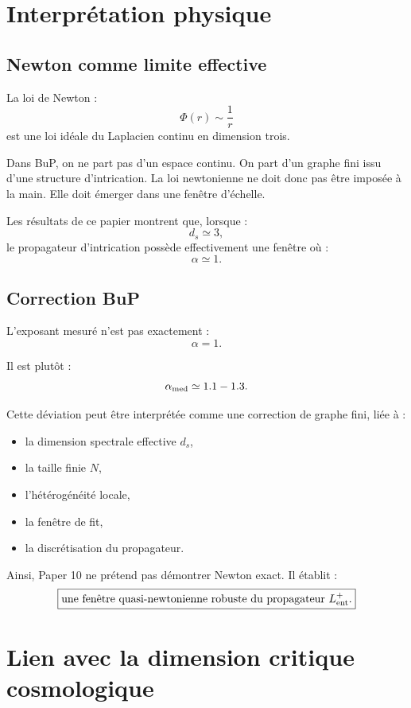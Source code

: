 \documentclass[11pt,a4paper]{article}
\begin{document}
\section{Interprétation physique}

\subsection{Newton comme limite effective}

La loi de Newton :
\[
\Phi(r)
\sim
\frac{1}{r}
\]
est une loi idéale du Laplacien continu en dimension trois.

Dans BuP, on ne part pas d'un espace continu. On part d'un graphe fini issu
d'une structure d'intrication. La loi newtonienne ne doit donc pas être imposée
à la main. Elle doit émerger dans une fenêtre d'échelle.

Les résultats de ce papier montrent que, lorsque :
\[
d_s\simeq3,
\]
le propagateur d'intrication possède effectivement une fenêtre où :
\[
\alpha\simeq1.
\]

\subsection{Correction BuP}

L'exposant mesuré n'est pas exactement :
\[
\alpha=1.
\]

Il est plutôt :
\[
\alpha_{\rm med}\simeq1.1-1.3.
\]

Cette déviation peut être interprétée comme une correction de graphe fini,
liée à :

\begin{itemize}
\item la dimension spectrale effective \(d_s\),
\item la taille finie \(N\),
\item l'hétérogénéité locale,
\item la fenêtre de fit,
\item la discrétisation du propagateur.
\end{itemize}

Ainsi, Paper 10 ne prétend pas démontrer Newton exact. Il établit :
\[
\boxed{
\text{une fenêtre quasi-newtonienne robuste du propagateur }L_{\rm ent}^{+}.
}
\]

\section{Lien avec la dimension critique cosmologique}
\end{document}
